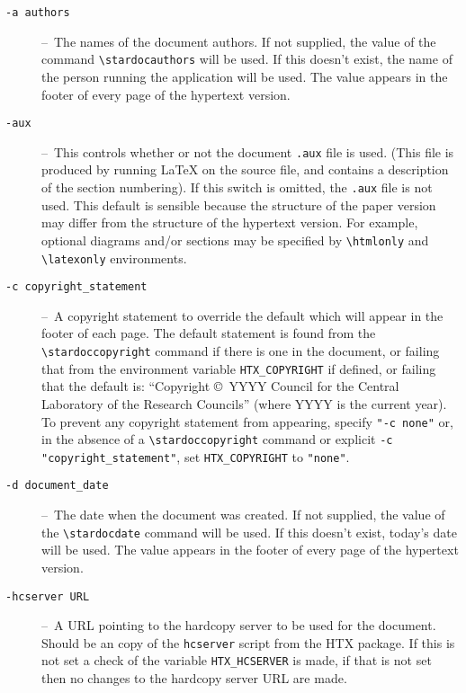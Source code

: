 \documentclass[twoside,11pt,nolof]{starlink}
\providecommand{\dash}{--}
\begin{document}
\begin{description}

\item[\texttt{-a authors}] \dash\
   The names of the document authors.
   If not supplied, the value of the command \verb#\stardocauthors# will be
   used.
   If this doesn't exist, the name of the person running the application will
   be used.
   The value appears in the footer of every page of the hypertext version.

\item[\texttt{-aux}] \dash\
   This controls whether or not the document \texttt{.aux} file is used.
   (This file is produced by running LaTeX on the source file, and contains a
   description of the section numbering).
   If this switch is omitted, the \texttt{.aux} file is not used.
   This default is sensible because the structure of the paper version
   may differ from the structure of the hypertext version.
   For example, optional diagrams and/or sections may be specified by
   \verb+\htmlonly+ and \verb+\latexonly+ environments.

\item[\texttt{-c copyright\_statement}] \dash\
   A copyright statement to override the default which will appear
   in the footer of each page. The default statement is found from
   the \verb#\stardoccopyright# command if there is one in the document, or
   failing that from the environment variable \verb#HTX_COPYRIGHT# if defined,
   or failing that the default is: ``Copyright \copyright\ YYYY Council for
   the Central Laboratory of the Research Councils'' (where YYYY is the
   current year).
   To prevent any copyright statement from appearing, specify \verb#"-c none"#
   or, in the absence of a \verb#\stardoccopyright# command or explicit
   \verb#-c "copyright_statement"#, set  \verb#HTX_COPYRIGHT# to \verb#"none"#.

\item[\texttt{-d document\_date}] \dash\
   The date when the document was created.
   If not supplied, the value of the \verb#\stardocdate# command will be used.
   If this doesn't exist, today's date will be used.
   The value appears in the footer of every page of the hypertext version.

\item[\texttt{-hcserver URL}] \dash\
   A URL pointing to the hardcopy server to be used for the document.
   Should be an copy of the \texttt{hcserver} script from the HTX package.
   If this is not set a check of the variable \texttt{HTX\_HCSERVER} is made,
   if that is not set then no changes to the hardcopy server URL are made.


\end{description}
\end{document}
